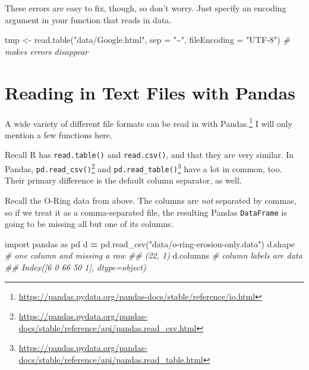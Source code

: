 \documentclass[
  12pt,
  krantz2]{krantz}
\makeatletter
\newenvironment{Shaded}{\begin{snugshade}}{\end{snugshade}}
\newcommand{\AttributeTok}[1]{\textcolor[rgb]{0.61,0.61,0.61}{#1}}
\newcommand{\CommentTok}[1]{\textcolor[rgb]{0.37,0.37,0.37}{\textit{#1}}}
\newcommand{\FunctionTok}[1]{\textcolor[rgb]{0,0,0}{#1}}
\newcommand{\ImportTok}[1]{#1}
\newcommand{\NormalTok}[1]{#1}
\newcommand{\OperatorTok}[1]{\textcolor[rgb]{0.43,0.43,0.43}{\textbf{#1}}}
\newcommand{\OtherTok}[1]{\textcolor[rgb]{0.37,0.37,0.37}{#1}}
\newcommand{\StringTok}[1]{\textcolor[rgb]{0.5,0.5,0.5}{#1}}
\renewcommand{\href}[2]{#2\footnote{\url{#1}}}
\newenvironment{kframe}{%
\medskip{}
\setlength{\fboxsep}{.8em}
 \def\at@end@of@kframe{}%
 \ifinner\ifhmode%
  \def\at@end@of@kframe{\end{minipage}}%
  \begin{minipage}{\columnwidth}%
 \fi\fi%
 \def\FrameCommand##1{\hskip\@totalleftmargin \hskip-\fboxsep
 \colorbox{shadecolor}{##1}\hskip-\fboxsep
     \hskip-\linewidth \hskip-\@totalleftmargin \hskip\columnwidth}%
 \MakeFramed {\advance\hsize-\width
   \@totalleftmargin\z@ \linewidth\hsize
   \@setminipage}}%
 {\par\unskip\endMakeFramed%
 \at@end@of@kframe}
\renewenvironment{Shaded}{\begin{kframe}}{\end{kframe}}
\makeatother
\begin{document}
These errors are easy to fix, though, so don't worry. Just specify an encoding argument in your function that reads in data.

\begin{Shaded}
\begin{Highlighting}[]
\NormalTok{tmp }\OtherTok{\textless{}{-}} \FunctionTok{read.table}\NormalTok{(}\StringTok{"data/Google.html"}\NormalTok{, }\AttributeTok{sep =} \StringTok{"\textasciitilde{}"}\NormalTok{, }
                  \AttributeTok{fileEncoding =} \StringTok{"UTF{-}8"}\NormalTok{) }\CommentTok{\# makes errors disappear}
\end{Highlighting}
\end{Shaded}

\hypertarget{reading-in-text-files-with-pandas}{%
\section{Reading in Text Files with Pandas}\label{reading-in-text-files-with-pandas}}

A \href{https://pandas.pydata.org/pandas-docs/stable/reference/io.html}{wide variety of different file formats can be read in with Pandas.} I will only mention a few functions here.

Recall R has \texttt{read.table()} and \texttt{read.csv()}, and that they are very similar. In Pandas, \href{https://pandas.pydata.org/pandas-docs/stable/reference/api/pandas.read_csv.html}{\texttt{pd.read\_csv()}} and \href{https://pandas.pydata.org/pandas-docs/stable/reference/api/pandas.read_table.html}{\texttt{pd.read\_table()}} have a lot in common, too. Their primary difference is the default column separator, as well.

Recall the O-Ring data from above. The columns are \emph{not} separated by commas, so if we treat it as a comma-separated file, the resulting Pandas \texttt{DataFrame} is going to be missing all but one of its columns.

\begin{Shaded}
\begin{Highlighting}[]
\ImportTok{import}\NormalTok{ pandas }\ImportTok{as}\NormalTok{ pd}
\NormalTok{d }\OperatorTok{=}\NormalTok{ pd.read\_csv(}\StringTok{"data/o{-}ring{-}erosion{-}only.data"}\NormalTok{)}
\NormalTok{d.shape }\CommentTok{\# one column and missing a row}
\CommentTok{\#\# (22, 1)}
\NormalTok{d.columns }\CommentTok{\# column labels are data}
\CommentTok{\#\# Index([\textquotesingle{}6 0 66  50  1\textquotesingle{}], dtype=\textquotesingle{}object\textquotesingle{})}
\end{Highlighting}
\end{Shaded}
\end{document}
